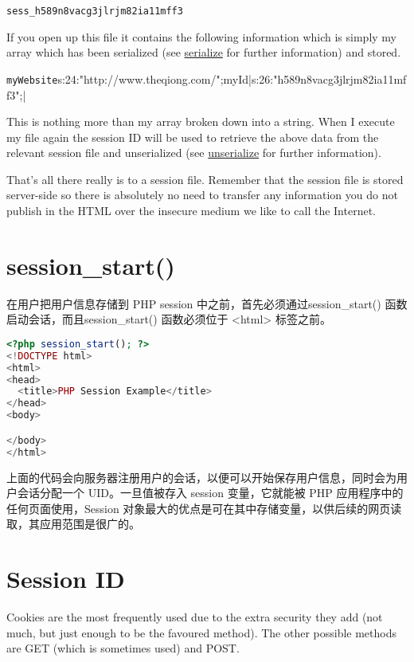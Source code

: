 \verb|sess_h589n8vacg3jlrjm82ia11mff3|

If you open up this file it contains the following information which is simply my array which has been serialized (see \href{http://www.php.net/serialize}{serialize} for further information) and stored.

\verb|myWebsite|s:24:"http://www.theqiong.com/";myId|s:26:"h589n8vacg3jlrjm82ia11mff3";|

This is nothing more than my array broken down into a string. When I execute my file again the session ID will be used to retrieve the above data from the relevant session file and unserialized (see \href{http://www.php.net/unserialize}{unserialize} for further information).

That's all there really is to a session file. Remember that the session file is stored server-side so there is absolutely no need to transfer any information you do not publish in the HTML over the insecure medium we like to call the Internet.



\section{session\_start()}


在用户把用户信息存储到 PHP session 中之前，首先必须通过session\_start() 函数启动会话，而且session\_start() 函数必须位于 <html> 标签之前。

\begin{lstlisting}[language=PHP]
<?php session_start(); ?>
<!DOCTYPE html>
<html>
<head>
  <title>PHP Session Example</title>
</head>
<body>

</body>
</html>
\end{lstlisting}

上面的代码会向服务器注册用户的会话，以便可以开始保存用户信息，同时会为用户会话分配一个 UID。一旦值被存入 session 变量，它就能被 PHP 应用程序中的任何页面使用，Session 对象最大的优点是可在其中存储变量，以供后续的网页读取，其应用范围是很广的。



\section{Session ID}


Cookies are the most frequently used due to the extra security they add (not much, but just enough to be the favoured method). The other possible methods are GET (which is sometimes used) and POST.

